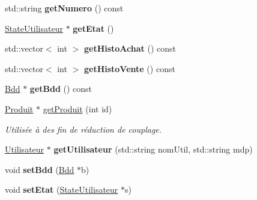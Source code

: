 \begin{DoxyCompactItemize}
\item 
\hypertarget{classUtilisateur_a5a79bcadd84048cd84e227308b51ae01}{std\-::string {\bfseries get\-Numero} () const }\label{classUtilisateur_a5a79bcadd84048cd84e227308b51ae01}

\item 
\hypertarget{classUtilisateur_a3f2d52048f66f37a0caaf4d1872664a2}{\hyperlink{classStateUtilisateur}{State\-Utilisateur} $\ast$ {\bfseries get\-Etat} ()}\label{classUtilisateur_a3f2d52048f66f37a0caaf4d1872664a2}

\item 
\hypertarget{classUtilisateur_ae64c47038e5786dfb003e755b1e1f432}{std\-::vector$<$ int $>$ {\bfseries get\-Histo\-Achat} () const }\label{classUtilisateur_ae64c47038e5786dfb003e755b1e1f432}

\item 
\hypertarget{classUtilisateur_a3c8c96807432b68f5f2aa0f4e01e8ce1}{std\-::vector$<$ int $>$ {\bfseries get\-Histo\-Vente} () const }\label{classUtilisateur_a3c8c96807432b68f5f2aa0f4e01e8ce1}

\item 
\hypertarget{classUtilisateur_a85dc60f77b270d74b7fa33147804575a}{\hyperlink{classBdd}{Bdd} $\ast$ {\bfseries get\-Bdd} () const }\label{classUtilisateur_a85dc60f77b270d74b7fa33147804575a}

\item 
\hyperlink{classProduit}{Produit} $\ast$ \hyperlink{classUtilisateur_aa62e585189589dc77a7edaf5afb3b7e4}{get\-Produit} (int id)
\begin{DoxyCompactList}\small\item\em Utilisée à des fin de réduction de couplage. \end{DoxyCompactList}\item 
\hypertarget{classUtilisateur_ae087f4d94434085de46f7b4698f2ee1f}{\hyperlink{classUtilisateur}{Utilisateur} $\ast$ {\bfseries get\-Utilisateur} (std\-::string nom\-Util, std\-::string mdp)}\label{classUtilisateur_ae087f4d94434085de46f7b4698f2ee1f}

\item 
\hypertarget{classUtilisateur_a17f8432b3d5e6e6fafb839926a16d1d8}{void {\bfseries set\-Bdd} (\hyperlink{classBdd}{Bdd} $\ast$b)}\label{classUtilisateur_a17f8432b3d5e6e6fafb839926a16d1d8}

\item 
\hypertarget{classUtilisateur_a22ffb78a049164a0a6f43e552d2cc933}{void {\bfseries set\-Etat} (\hyperlink{classStateUtilisateur}{State\-Utilisateur} $\ast$s)}\label{classUtilisateur_a22ffb78a049164a0a6f43e552d2cc933}


\end{DoxyCompactItemize}
